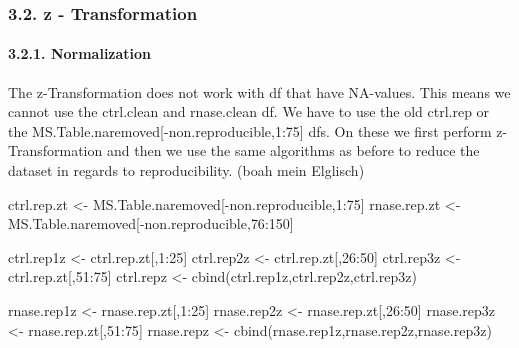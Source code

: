 \documentclass[
]{article}
\newenvironment{Shaded}{\begin{snugshade}}{\end{snugshade}}
\newcommand{\DecValTok}[1]{\textcolor[rgb]{0.00,0.00,0.81}{#1}}
\newcommand{\FunctionTok}[1]{\textcolor[rgb]{0.00,0.00,0.00}{#1}}
\newcommand{\NormalTok}[1]{#1}
\newcommand{\OtherTok}[1]{\textcolor[rgb]{0.56,0.35,0.01}{#1}}
\newcommand{\SpecialCharTok}[1]{\textcolor[rgb]{0.00,0.00,0.00}{#1}}
\begin{document}
\hypertarget{z---transformation}{%
\subsubsection{3.2. z - Transformation}\label{z---transformation}}

\hypertarget{normalization-1}{%
\paragraph{3.2.1. Normalization}\label{normalization-1}}

The z-Transformation does not work with df that have NA-values. This
means we cannot use the ctrl.clean and rnase.clean df. We have to use
the old ctrl.rep or the MS.Table.naremoved{[}-non.reproducible,1:75{]}
dfs. On these we first perform z-Transformation and then we use the same
algorithms as before to reduce the dataset in regards to
reproducibility. (boah mein Elglisch)

\begin{Shaded}
\begin{Highlighting}[]
\NormalTok{ctrl.rep.zt }\OtherTok{\textless{}{-}}\NormalTok{ MS.Table.naremoved[}\SpecialCharTok{{-}}\NormalTok{non.reproducible,}\DecValTok{1}\SpecialCharTok{:}\DecValTok{75}\NormalTok{]}
\NormalTok{rnase.rep.zt }\OtherTok{\textless{}{-}}\NormalTok{ MS.Table.naremoved[}\SpecialCharTok{{-}}\NormalTok{non.reproducible,}\DecValTok{76}\SpecialCharTok{:}\DecValTok{150}\NormalTok{]}

\NormalTok{ctrl.rep1z }\OtherTok{\textless{}{-}}\NormalTok{ ctrl.rep.zt[,}\DecValTok{1}\SpecialCharTok{:}\DecValTok{25}\NormalTok{]}
\NormalTok{ctrl.rep2z }\OtherTok{\textless{}{-}}\NormalTok{ ctrl.rep.zt[,}\DecValTok{26}\SpecialCharTok{:}\DecValTok{50}\NormalTok{]}
\NormalTok{ctrl.rep3z }\OtherTok{\textless{}{-}}\NormalTok{ ctrl.rep.zt[,}\DecValTok{51}\SpecialCharTok{:}\DecValTok{75}\NormalTok{]}
\NormalTok{ctrl.repz }\OtherTok{\textless{}{-}} \FunctionTok{cbind}\NormalTok{(ctrl.rep1z,ctrl.rep2z,ctrl.rep3z)}


\NormalTok{rnase.rep1z }\OtherTok{\textless{}{-}}\NormalTok{ rnase.rep.zt[,}\DecValTok{1}\SpecialCharTok{:}\DecValTok{25}\NormalTok{]}
\NormalTok{rnase.rep2z }\OtherTok{\textless{}{-}}\NormalTok{ rnase.rep.zt[,}\DecValTok{26}\SpecialCharTok{:}\DecValTok{50}\NormalTok{]}
\NormalTok{rnase.rep3z }\OtherTok{\textless{}{-}}\NormalTok{ rnase.rep.zt[,}\DecValTok{51}\SpecialCharTok{:}\DecValTok{75}\NormalTok{]}
\NormalTok{rnase.repz }\OtherTok{\textless{}{-}} \FunctionTok{cbind}\NormalTok{(rnase.rep1z,rnase.rep2z,rnase.rep3z)}
\end{Highlighting}
\end{Shaded}
\end{document}

